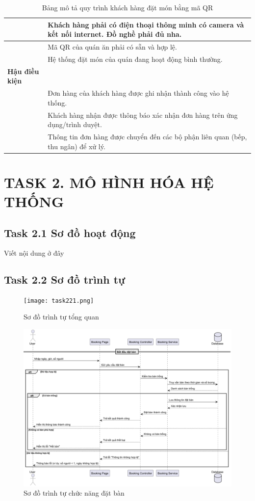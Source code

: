 \documentclass[a4paper]{article}
\begin{document}
\begin{table}[!htbp]
\begin{tabular}{|l|p{10cm}|}
\hline
& Khách hàng phải có điện thoại thông minh có camera và kết nối internet. Đồ nghề phải đủ nha. \\
\hline
& Mã QR của quán ăn phải có sẵn và hợp lệ. \\
\hline
& Hệ thống đặt món của quán đang hoạt động bình thường. \\
\hline
\textbf{Hậu điều kiện} & \\
\hline
& Đơn hàng của khách hàng được ghi nhận thành công vào hệ thống. \\
\hline
& Khách hàng nhận được thông báo xác nhận đơn hàng trên ứng dụng/trình duyệt. \\
\hline
& Thông tin đơn hàng được chuyển đến các bộ phận liên quan (bếp, thu ngân) để xử lý.\\
\hline
\end{tabular}
\caption{Bảng mô tả quy trình khách hàng đặt món bằng mã QR}
\label{tab:dat_mon_qr}
\end{table}
    
    
\newpage
\section{TASK 2. MÔ HÌNH HÓA HỆ THỐNG}

\subsection{Task 2.1 Sơ đồ hoạt động}
Viết nội dung ở đây

\subsection{Task 2.2 Sơ đồ trình tự}
    \begin{figure}[H]
        \centering
        \texttt{[image: task221.png]}
        \caption{Sơ đồ trình tự tổng quan}
    \end{figure}
    \begin{figure}[H]
        \centering
        \includegraphics[width=1.0\textwidth]{task22.png}
        \caption{Sơ đồ trình tự chức năng đặt bàn}
    \end{figure}
\end{document}
